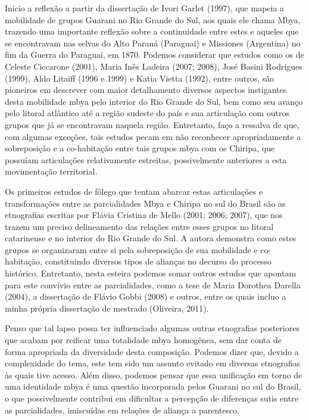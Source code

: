 Inicio a reflexão a partir da dissertação de Ivori Garlet (1997), que
mapeia a mobilidade de grupos Guarani no Rio Grande do Sul, aos quais
ele chama Mbya, trazendo uma importante reflexão sobre a continuidade
entre estes e aqueles que se encontravam nas selvas do Alto Paraná
(Paraguai) e Missiones (Argentina) no fim da Guerra do Paraguai, em
1870. Podemos considerar que estudos como os de Celeste Ciccarone
(2001), Maria Inês Ladeira (2007; 2008), José Basini Rodrigues (1999),
Aldo Litaiff (1996 e 1999) e Katia Vietta (1992), entre outros, são
pioneiros em descrever com maior detalhamento diversos aspectos
instigantes desta mobilidade mbya pelo interior do Rio Grande do Sul,
bem como seu avanço pelo litoral atlântico até a região sudeste do país
e sua articulação com outros grupos que já se encontravam naquela
região. Entretanto, faço a ressalva de que, com algumas exceções, tais
estudos pecam em não reconhecer apropriadamente a sobreposição e a
co-habitação entre tais grupos mbya com os Chiripa, que possuíam
articulações relativamente estreitas, possivelmente anteriores a esta
movimentação territorial.

Os primeiros estudos de fôlego que tentam abarcar estas articulações e
transformações entre as parcialidades Mbya e Chiripa no sul do Brasil
são as etnografias escritas por Flávia Cristina de Mello (2001; 2006;
2007), que nos trazem um preciso delineamento das relações entre esses
grupos no litoral catarinense e no interior do Rio Grande do Sul. A
autora demonstra como estes grupos se organizaram entre si pela
sobreposição de sua mobilidade e co-habitação, constituindo diversos
tipos de alianças no decurso do processo histórico. Entretanto, nesta
esteira podemos somar outros estudos que apontam para este convívio
entre as parcialidades, como a tese de Maria Dorothea Darella (2004), a
dissertação de Flávio Gobbi (2008) e outros, entre os quais incluo a
minha própria dissertação de mestrado (Oliveira, 2011).

Penso que tal lapso possa ter influenciado algumas outras etnografias
posteriores que acabam por reificar uma totalidade mbya homogênea, sem
dar conta de forma apropriada da diversidade desta composição. Podemos
dizer que, devido a complexidade do tema, este tem sido um assunto
evitado em diversas etnografias às quais tive acesso. Além disso,
podemos pensar que essa unificação em torno de uma identidade mbya é uma
questão incorporada pelos Guarani no sul do Brasil, o que possivelmente
contribui em dificultar a percepção de diferenças sutis entre as
parcialidades, imiscuídas em relações de aliança a parentesco.

